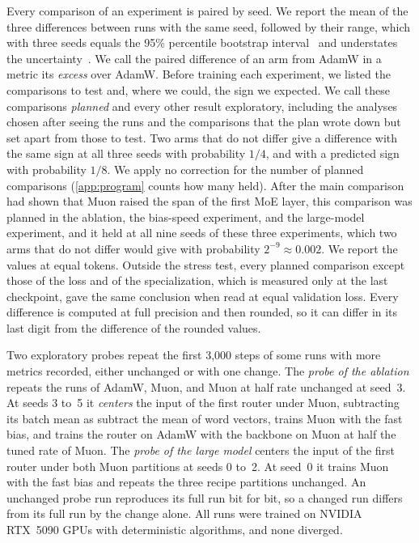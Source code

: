 \documentclass[11pt, a4paper]{article}
\begin{document}
Every comparison of an experiment is paired by seed. We report the mean of the three differences between runs with the same seed, followed by their range, which with three seeds equals the 95\% percentile bootstrap interval~\citep{efron1993introduction} and understates the uncertainty~\citep{agarwal2021precipice}. We call the paired difference of an arm from AdamW in a metric its \emph{excess} over AdamW\@. Before training each experiment, we listed the comparisons to test and, where we could, the sign we expected. We call these comparisons \emph{planned} and every other result exploratory, including the analyses chosen after seeing the runs and the comparisons that the plan wrote down but set apart from those to test. Two arms that do not differ give a difference with the same sign at all three seeds with probability $1/4$, and with a predicted sign with probability $1/8$. We apply no correction for the number of planned comparisons (\cref{app:program} counts how many held). After the main comparison had shown that Muon raised the span of the first MoE layer, this comparison was planned in the ablation, the bias-speed experiment, and the large-model experiment, and it held at all nine seeds of these three experiments, which two arms that do not differ would give with probability $2^{-9} \approx 0.002$. We report the values at equal tokens. Outside the stress test, every planned comparison except those of the loss and of the specialization, which is measured only at the last checkpoint, gave the same conclusion when read at equal validation loss. Every difference is computed at full precision and then rounded, so it can differ in its last digit from the difference of the rounded values.

Two exploratory probes repeat the first 3,000 steps of some runs with more metrics recorded, either unchanged or with one change. The \emph{probe of the ablation} repeats the runs of AdamW, Muon, and Muon at half rate unchanged at seed~3. At seeds 3 to~5 it \emph{centers} the input of the first router under Muon, subtracting its batch mean as \citet{mu2018allbutthetop} subtract the mean of word vectors, trains Muon with the fast bias, and trains the router on AdamW with the backbone on Muon at half the tuned rate of Muon. The \emph{probe of the large model} centers the input of the first router under both Muon partitions at seeds 0 to~2. At seed~0 it trains Muon with the fast bias and repeats the three recipe partitions unchanged. An unchanged probe run reproduces its full run bit for bit, so a changed run differs from its full run by the change alone. All runs were trained on NVIDIA RTX~5090 GPUs with deterministic algorithms, and none diverged.
\end{document}
